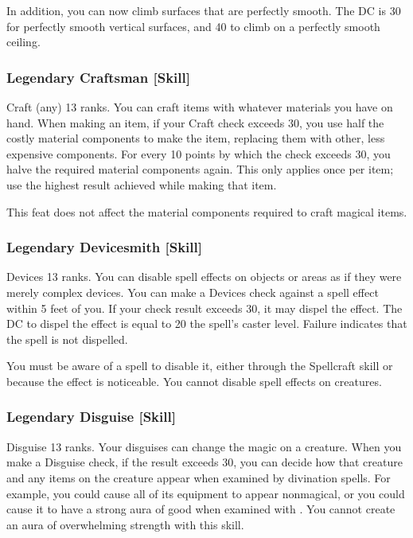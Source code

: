 In addition, you can now climb surfaces that are perfectly smooth. The DC is 30 for perfectly smooth vertical surfaces, and 40 to climb on a perfectly smooth ceiling.

\subsubsection{Legendary Craftsman [Skill]}
\featpre Craft (any) 13 ranks.
\featben You can craft items with whatever materials you have on hand. When making an item, if your Craft check exceeds 30, you use half the costly material components to make the item, replacing them with other, less expensive components. For every 10 points by which the check exceeds 30, you halve the required material components again. This only applies once per item; use the highest result achieved while making that item.

This feat does not affect the material components required to craft magical items.

\subsubsection{Legendary Devicesmith [Skill]}
\featpre Devices 13 ranks.
\featben You can disable spell effects on objects or areas as if they were merely complex devices. You can make a Devices check against a spell effect within 5 feet of you. If your check result exceeds 30, it may dispel the effect. The DC to dispel the effect is equal to 20 \add the spell's caster level. Failure indicates that the spell is not dispelled. 

You must be aware of a spell to disable it, either through the Spellcraft skill or because the effect is noticeable. You cannot disable spell effects on creatures.

\subsubsection{Legendary Disguise [Skill]}
\featpre Disguise 13 ranks.
\featben Your disguises can change the magic on a creature. When you make a Disguise check, if the result exceeds 30, you can decide how that creature and any items on the creature appear when examined by divination spells. For example, you could cause all of its equipment to appear nonmagical, or you could cause it to have a strong aura of good when examined with . You cannot create an aura of overwhelming strength with this skill.

